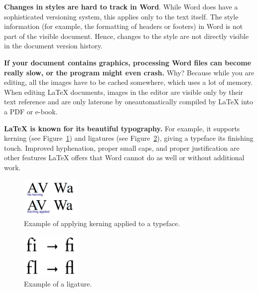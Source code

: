 \textbf{Changes in styles are hard to track in Word}. While Word does have a sophisticated versioning system, this applies only to the text itself. The style information (for example, the formatting of headers or footers) in Word is not part of the visible document. Hence, changes to the style are not directly visible in the document version history.



\textbf{If your document contains graphics, processing Word files can become really slow, or the program might even crash.} Why? Because while you are editing, all the images have to be cached somewhere, which uses a lot of memory. When editing LaTeX documents, images in the editor are visible only by their text reference and are only later\emdash{}one by one\emdash{}automatically compiled by LaTeX into a PDF or e-book.

\textbf{LaTeX is known for its beautiful typography.} For example, it supports kerning (see Figure~\ref{kerning:fig}) and ligatures (see Figure~\ref{ligatures:fig}), giving a typeface its finishing touch. Improved hyphenation, proper small caps, and proper justification are other features LaTeX offers that Word cannot do as well or without additional work.

\begin{figure}[H]\centering
\includegraphics[width=0.25\textwidth]{images/1920px-Kerning-EN.png}
\caption{Example of applying kerning applied to a typeface.}
\label{kerning:fig}
\end{figure}

\begin{figure}[H]\centering
\includegraphics[width=0.25\textwidth]{images/Ligature-drawing.png}
\caption{Example of a ligature.}
\label{ligatures:fig}
\end{figure}

